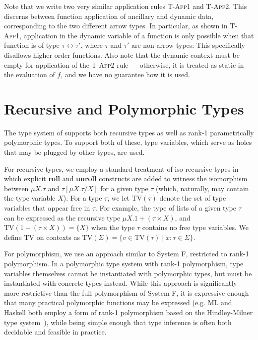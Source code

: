 Note that we write two very similar application rules \textsc{T-App1} and
\textsc{T-App2}. This discerns between function application of ancillary and
dynamic data, corresponding to the two different arrow types. In particular, as
shown in \textsc{T-App1}, application in the dynamic variable of a function is
only possible when that function is of type $\tau \leftrightarrow \tau'$, where
$\tau$ and $\tau'$ are non-arrow types: This specifically disallows
higher-order functions. Also note that the dynamic context must be empty for
application of the \textsc{T-App2} rule --- otherwise, it is treated as static
in the evaluation of $f$, and we have no guarantee how it is used.

\section{Recursive and Polymorphic Types}

The type system of \rfunc supports both recursive types as well as rank-1
parametrically polymorphic types. To support both of these, type variables,
which serve as holes that may be plugged by other types, are used.

For recursive types, we employ a standard treatment of iso-recursive types in
which explicit \textbf{roll} and \textbf{unroll} constructs are added to
witness the isomorphism between $\mu X. \tau$ and $\tau[\mu X. \tau/X]$ for a
given type $\tau$ (which, naturally, may contain the type variable $X$). For a
type $\tau$, we let $\text{TV}(\tau)$ denote the set of type variables that
appear free in $\tau$. For example, the type of lists of a given type $\tau$
can be expressed as the recursive type $\mu X. 1 + (\tau \times X)$, and
$\text{TV}(1 + (\tau \times X)) = \{X\}$ when the type $\tau$ contains no free
type variables. We define TV on contexts as $\text{TV}(\Sigma) = \{ v \in
\text{TV}(\tau) \mid x : \tau \in \Sigma \}$.

For polymorphism, we use an approach similar to System F, restricted to rank-1
polymorphism. In a polymorphic type system with rank-1 polymorphism, type
variables themselves cannot be instantiated with polymorphic types, but must be
instantiated with concrete types instead. While this approach is significantly
more restrictive than the full polymorphism of System F, it is expressive
enough that many practical polymorphic functions may be expressed (e.g.  ML and
Haskell both employ a form of rank-1 polymorphism based on the Hindley-Milner
type system~\cite{Milner:1978}), while being simple enough that type inference
is often both decidable and feasible in practice.

